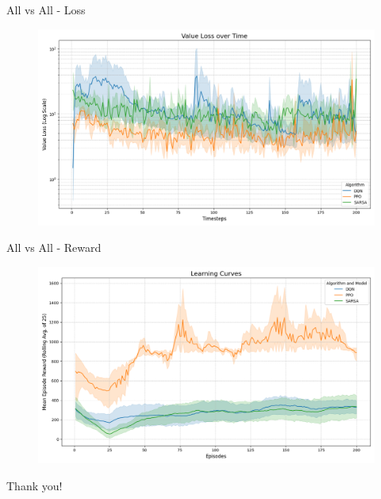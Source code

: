 \documentclass[serif]{beamer}  %
\begin{document}
\begin{frame}{All vs All - Loss}
    \begin{figure}
        \centering
        \includegraphics[width=\linewidth]{plots/all_value_loss_curve.png}
    \end{figure}
\end{frame}

\begin{frame}{All vs All - Reward}
    \begin{figure}
        \centering
        \includegraphics[width=\linewidth]{plots/all_reward_curve.png}
    \end{figure}
\end{frame}


\begin{frame}
\centering
{\Huge Thank you!}
\end{frame}
\end{document}
